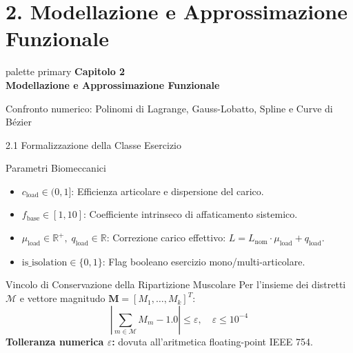 \documentclass[aspectratio=169, 10pt]{beamer}
\begin{document}
\section{2. Modellazione e Approssimazione Funzionale}

\begin{frame}
    \vfill
    \centering
    \begin{beamercolorbox}[sep=10pt,center,shadow=true,rounded=true]{palette primary}
        {\Huge \textbf{Capitolo 2}}\\[0.3cm]
        {\LARGE \textbf{Modellazione e Approssimazione Funzionale}}
    \end{beamercolorbox}
    \vspace{0.4cm}
    {\normalsize \textcolor{secondaryColor}{Confronto numerico: Polinomi di Lagrange, Gauss-Lobatto, Spline e Curve di Bézier}}
    \vfill
\end{frame}

\begin{frame}{2.1 Formalizzazione della Classe Esercizio}
    \begin{block}{Parametri Biomeccanici}
        \begin{itemize}
            \item $c_{\mathrm{load}} \in (0, 1]$: Efficienza articolare e dispersione del carico.
            \item $f_{\mathrm{base}} \in [1, 10]$: Coefficiente intrinseco di affaticamento sistemico.
            \item $\mu_{\mathrm{load}} \in \mathbb{R}^+, \; q_{\mathrm{load}} \in \mathbb{R}$: Correzione carico effettivo: $L = L_{\mathrm{nom}} \cdot \mu_{\mathrm{load}} + q_{\mathrm{load}}$.
            \item $\mathrm{is\_isolation} \in \{0, 1\}$: Flag booleano esercizio mono/multi-articolare.
        \end{itemize}
    \end{block}
    \begin{alertblock}{Vincolo di Conservazione della Ripartizione Muscolare}
        Per l'insieme dei distretti $\mathcal{M}$ e vettore magnitudo $\mathbf{M} = [M_1, \dots, M_k]^T$:
        $$\left| \sum_{m \in \mathcal{M}} M_m - 1.0 \right| \le \varepsilon, \quad \varepsilon \le 10^{-4}$$
        \footnotesize \textbf{Tolleranza numerica $\varepsilon$:} dovuta all'aritmetica floating-point IEEE 754.
\end{alertblock}
\end{frame}
\end{document}
